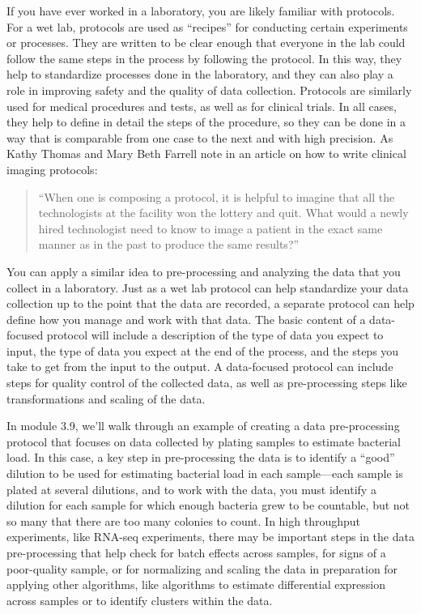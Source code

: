 \documentclass[]{tufte-book}
\begin{document}
If you have ever worked in a laboratory, you are likely familiar with protocols.
For a wet lab, protocols are used as ``recipes'' for conducting certain
experiments or processes. They are written to be clear enough that everyone in
the lab could follow the same steps in the process by following the protocol. In
this way, they help to standardize processes done in the laboratory, and they
can also play a role in improving safety and the quality of data collection.
Protocols are similarly used for medical procedures and
tests, as well as for clinical trials. In all cases, they help to define in
detail the steps of the procedure, so they can be done in a way that is
comparable from one case to the next and with high precision.
As Kathy Thomas and Mary Beth Farrell note in an article on how to write
clinical imaging protocols:

\begin{quote}
``When one is composing a protocol, it is helpful
to imagine that all the technologists at the facility won the
lottery and quit. What would a newly hired technologist
need to know to image a patient in the exact same manner
as in the past to produce the same results?''
\citep{thomas2015write}
\end{quote}

You can apply a similar idea to pre-processing and analyzing the data that you
collect in a laboratory. Just as a wet lab protocol can help standardize your
data collection up to the point that the data are recorded, a separate protocol
can help define how you manage and work with that data.
The basic content of a data-focused protocol will include a description of the type of data
you expect to input, the type of data you expect at the end of the process,
and the steps you take to get from the input to the output.
A data-focused protocol can include steps for quality control of the
collected data, as well as pre-processing steps like transformations and
scaling of the data.

In module 3.9, we'll walk through an example of creating a data pre-processing
protocol that focuses on data collected by plating samples to estimate
bacterial load. In this case, a key step in pre-processing the data is to
identify a ``good'' dilution to be used for estimating bacterial load in each
sample---each sample is plated at several dilutions, and to work with the data,
you must identify a dilution for each sample for which enough bacteria grew to
be countable, but not so many that there are too many colonies to count. In high
throughput experiments, like RNA-seq experiments, there may be important steps
in the data pre-processing that help check for batch effects across samples, for
signs of a poor-quality sample, or for normalizing and scaling the data in
preparation for applying other algorithms, like algorithms to estimate
differential expression across samples or to identify clusters within the data.
\end{document}
